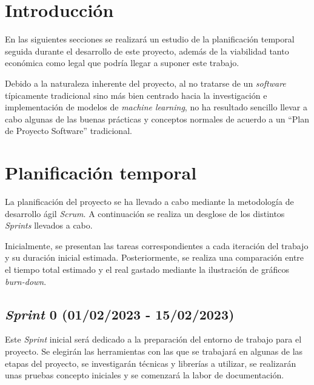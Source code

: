 
\section{Introducción}

En las siguientes secciones se realizará un estudio de la planificación temporal seguida durante el desarrollo de este proyecto, además de la viabilidad tanto económica como legal que podría llegar a suponer este trabajo.

Debido a la naturaleza inherente del proyecto, al no tratarse de un \textit{software} típicamente tradicional sino más bien centrado hacia la investigación e implementación de modelos de \textit{machine learning}, no ha resultado sencillo llevar a cabo algunas de las buenas prácticas y conceptos normales de acuerdo a un ``Plan de Proyecto Software'' tradicional.

\section{Planificación temporal}

La planificación del proyecto se ha llevado a cabo mediante la metodología de desarrollo ágil \textit{Scrum}. A continuación se realiza un desglose de los distintos \textit{Sprints} llevados a cabo.

Inicialmente, se presentan las tareas correspondientes a cada iteración del trabajo y su duración inicial estimada. Posteriormente, se realiza una comparación entre el tiempo total estimado y el real gastado mediante la ilustración de gráficos \textit{burn-down}.

\subsection{\textit{Sprint} 0 (01/02/2023 - 15/02/2023)}

Este \textit{Sprint} inicial será dedicado a la preparación del entorno de trabajo para el proyecto. Se elegirán las herramientas con las que se trabajará en algunas de las etapas del proyecto, se investigarán técnicas y librerías a utilizar, se realizarán unas pruebas concepto iniciales y se comenzará la labor de documentación.

